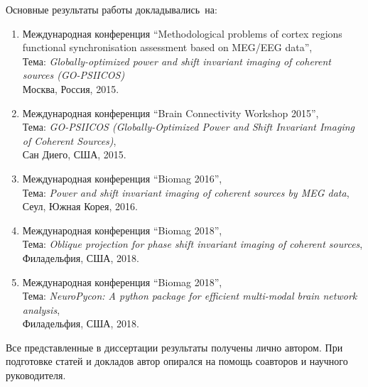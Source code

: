Основные результаты работы докладывались~на:
\begin{enumerate}
    \item Международная конференция ``Methodological problems of cortex regions functional synchronisation assessment based on MEG/EEG data'',\\
      Тема: \emph{Globally-optimized power and shift invariant imaging of coherent sources (GO-PSIICOS)}\\
      Москва, Россия, 2015.
    \item Международная конференция ``Brain Connectivity Workshop 2015'', \\
        Тема: \emph{GO-PSIICOS (Globally-Optimized Power and Shift Invariant Imaging of Coherent Sources)},\\
        Сан Диего, США, 2015.
    \item Международная конференция ``Biomag 2016'', \\
        Тема: \emph{Power and shift invariant imaging of coherent sources by MEG data},\\
        Сеул, Южная Корея, 2016.
    \item Международная конференция ``Biomag 2018'', \\
        Тема: \emph{Oblique projection for phase shift invariant imaging of coherent sources},\\
        Филадельфия, США, 2018.
    \item Международная конференция ``Biomag 2018'', \\
        Тема: \emph{NeuroPycon: A python package for efficient multi-modal brain network analysis},\\
        Филадельфия, США, 2018.
\end{enumerate}



{\contribution}
Все представленные в диссертации результаты
получены лично автором.
При подготовке статей и докладов автор опирался
на помощь соавторов и научного руководителя.

